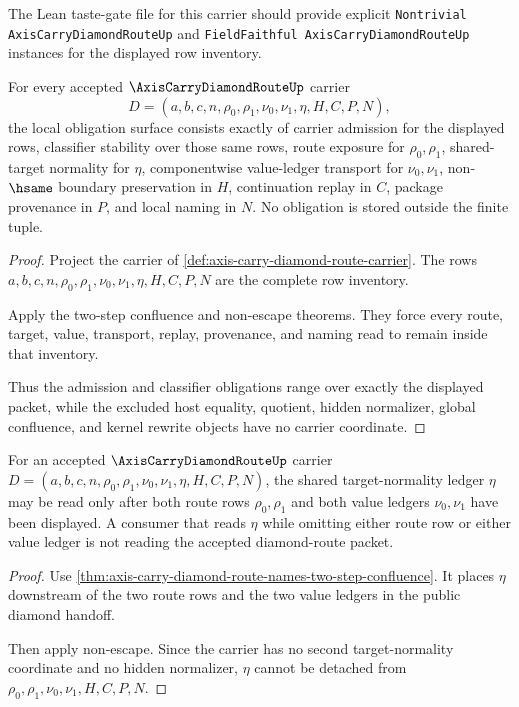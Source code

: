 The Lean taste-gate file for this carrier should provide explicit \texttt{Nontrivial AxisCarryDiamondRouteUp} and \texttt{FieldFaithful AxisCarryDiamondRouteUp} instances for the displayed row inventory.

\begin{theorem}
\label{thm:axis-carry-diamond-route-obligation-surface}
For every accepted $\AxisCarryDiamondRouteUp$ carrier
$$
D=(a,b,c,n,\rho_0,\rho_1,\nu_0,\nu_1,\eta,H,C,P,N),
$$
the local obligation surface consists exactly of carrier admission for the displayed rows, classifier stability over those same rows, route exposure for $\rho_0,\rho_1$, shared-target normality for $\eta$, componentwise value-ledger transport for $\nu_0,\nu_1$, non-$\hsame$ boundary preservation in $H$, continuation replay in $C$, package provenance in $P$, and local naming in $N$. No obligation is stored outside the finite tuple.
\end{theorem}
\begin{proof}
Project the carrier of \autoref{def:axis-carry-diamond-route-carrier}. The rows $a,b,c,n,\rho_0,\rho_1,\nu_0,\nu_1,\eta,H,C,P,N$ are the complete row inventory.

Apply the two-step confluence and non-escape theorems. They force every route, target, value, transport, replay, provenance, and naming read to remain inside that inventory.

Thus the admission and classifier obligations range over exactly the displayed packet, while the excluded host equality, quotient, hidden normalizer, global confluence, and kernel rewrite objects have no carrier coordinate.
\end{proof}

\begin{theorem}
\label{thm:axis-carry-diamond-route-target-ledger-exactness}
For an accepted $\AxisCarryDiamondRouteUp$ carrier $D=(a,b,c,n,\rho_0,\rho_1,\nu_0,\nu_1,\eta,H,C,P,N)$, the shared target-normality ledger $\eta$ may be read only after both route rows $\rho_0,\rho_1$ and both value ledgers $\nu_0,\nu_1$ have been displayed. A consumer that reads $\eta$ while omitting either route row or either value ledger is not reading the accepted diamond-route packet.
\end{theorem}
\begin{proof}
Use \autoref{thm:axis-carry-diamond-route-names-two-step-confluence}. It places $\eta$ downstream of the two route rows and the two value ledgers in the public diamond handoff.

Then apply non-escape. Since the carrier has no second target-normality coordinate and no hidden normalizer, $\eta$ cannot be detached from $\rho_0,\rho_1,\nu_0,\nu_1,H,C,P,N$.
\end{proof}

